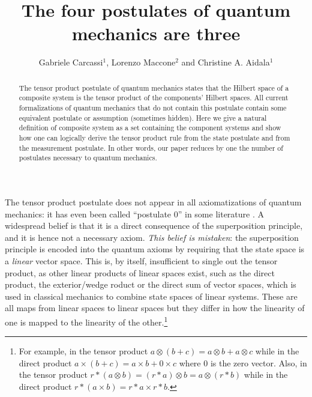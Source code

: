 \documentclass[aps,prl,amsmath,amssymb,twocolumn,nofootinbib]{revtex4}
\theoremstyle{plain}
\theoremstyle{definition}
\theoremstyle{remark}
\begin{document}
	
\title{The four postulates of quantum mechanics are three}
\author{Gabriele Carcassi$^1$, Lorenzo Maccone$^{2}$ and Christine A. Aidala$^1$
}
\begin{abstract}
The tensor product postulate of quantum mechanics states that the
Hilbert space of a composite system is the tensor product of the
components' Hilbert spaces. All current formalizations of quantum
mechanics that do not contain this postulate contain some equivalent
postulate or assumption (sometimes hidden). Here we give a natural
definition of composite system as a set containing the component
systems and show how one can logically derive the tensor product
rule from the state postulate and from the measurement postulate. In
other words, our paper reduces by one the number of postulates
necessary to quantum mechanics.
\end{abstract}
\pacs{}
\maketitle


The tensor product postulate does not appear in all axiomatizations of
quantum mechanics: it has even been called ``postulate 0'' in some
literature \cite{zurek}. A widespread belief is that it is a direct
consequence of the superposition principle, and it is hence not a
necessary axiom. {\em This belief is mistaken}: the superposition
principle is encoded into the quantum axioms by requiring that the
state space is a {\em linear} vector space. This is, by itself,
insufficient to single out the tensor product, as other linear
products of linear spaces exist, such as the direct product, the exterior/wedge roduct or the direct sum of vector spaces, which is used
	in classical mechanics to combine state spaces of linear systems. These are all maps from linear spaces to linear spaces but they differ in how the linearity of one is mapped to the linearity of the other.\footnote{For example, in the tensor product $a \otimes (b+c) = a \otimes b + a \otimes c$ while in the direct product $a \times (b+c) = a \times b + 0 \times c$ where $0$ is the zero vector. Also, in the tensor product $r * (a \otimes b) = (r*a) \otimes b = a \otimes (r*b)$ while in the direct product $r * (a \times b) = r*a \times r*b$.}
	
\end{document}
